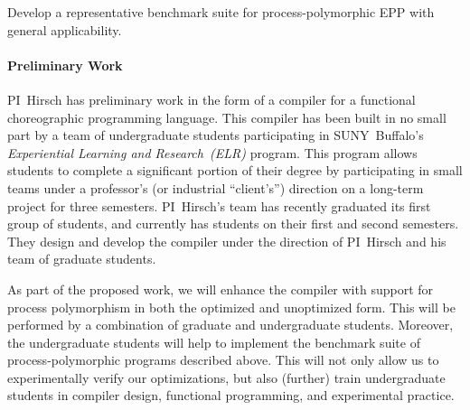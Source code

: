 \begin{goal}
  \label{goal:benchmark}
  Develop a representative benchmark suite for process-polymorphic EPP with general applicability.
\end{goal}

%
%
%

\paragraph{Preliminary Work}
PI~Hirsch has preliminary work in the form of a compiler for a functional choreographic programming language.
This compiler has been built in no small part by a team of undergraduate students participating in SUNY~Buffalo's \emph{Experiential Learning and Research~(ELR)} program.
This program allows students to complete a significant portion of their degree by participating in small teams under a professor's (or industrial ``client's'') direction on a long-term project for three semesters.
PI~Hirsch's team has recently graduated its first group of students, and currently has students on their first and second semesters.
They design and develop the compiler under the direction of PI~Hirsch and his team of graduate students.

As part of the proposed work, we will enhance the compiler with support for process polymorphism in both the optimized and unoptimized form.
This will be performed by a combination of graduate and undergraduate students.
Moreover, the undergraduate students will help to implement the benchmark suite of process-polymorphic programs described above.
This will not only allow us to experimentally verify our optimizations, but also (further) train undergraduate students in compiler design, functional programming, and experimental practice.

